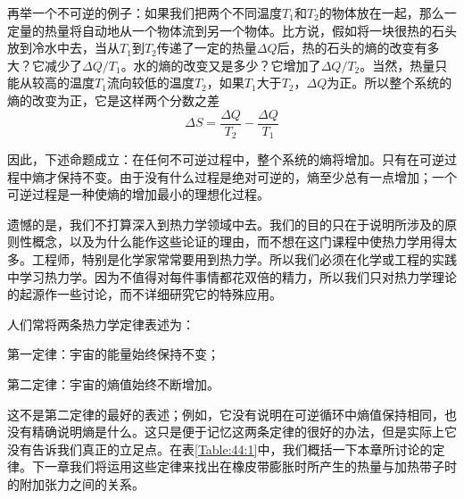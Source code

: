 再举一个不可逆的例子：如果我们把两个不同温度$T_1$和$T_2$的物体放在一起，那么一定量的热量将自动地从一个物体流到另一个物体。比方说，假如将一块很热的石头放到冷水中去，当从$T_1$到$T_2$传递了一定的热量$\Delta Q$后，热的石头的熵的改变有多大？它减少了$\Delta Q /T_1$。水的熵的改变又是多少？它增加了$\Delta Q /T_2$。当然，热量只能从较高的温度$T_1$流向较低的温度$T_2$，如果$T_1$大于$T_2$，$\Delta Q$为正。所以整个系统的熵的改变为正，它是这样两个分数之差
\begin{equation}
    \label{Eq:I:44:19}
    \Delta S = \frac{\Delta Q}{T_2} - \frac{\Delta Q}{T_1}
\end{equation}

因此，下述命题成立：在任何不可逆过程中，整个系统的熵将增加。只有在可逆过程中熵才保持不变。由于没有什么过程是绝对可逆的，熵至少总有一点增加；一个可逆过程是一种使熵的增加最小的理想化过程。

遗憾的是，我们不打算深入到热力学领域中去。我们的目的只在于说明所涉及的原则性概念，以及为什么能作这些论证的理由，而不想在这门课程中使热力学用得太多。工程师，特别是化学家常常要用到热力学。所以我们必须在化学或工程的实践中学习热力学。因为不值得对每件事情都花双倍的精力，所以我们只对热力学理论的起源作一些讨论，而不详细研究它的特殊应用。

人们常将两条热力学定律表述为：

第一定律：宇宙的能量始终保持不变；

第二定律：宇宙的熵值始终不断增加。

这不是第二定律的最好的表述；例如，它没有说明在可逆循环中熵值保持相同，也没有精确说明熵是什么。这只是便于记忆这两条定律的很好的办法，但是实际上它没有告诉我们真正的立足点。在表\ref{Table:44:1}中，我们概括一下本章所讨论的定律。下一章我们将运用这些定律来找出在橡皮带膨胀时所产生的热量与加热带子时的附加张力之间的关系。

